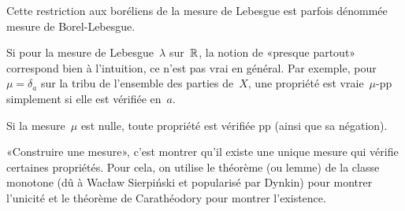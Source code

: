 Cette restriction aux boréliens de la mesure de Lebesgue est parfois dénommée mesure de Borel-Lebesgue.

\medskip
Si pour la mesure de Lebesgue~$\lambda$ sur~$\mathbb R$, la notion de «presque partout» correspond bien à l'intuition, ce n'est pas vrai en général.
Par exemple, pour~$\mu=\delta_a$ sur la tribu de l'ensemble des parties de~$X$, une propriété est vraie~$\mu$-pp simplement si elle est vérifiée en~$a$.

Si la mesure~$\mu$ est nulle, toute propriété est vérifiée pp (ainsi que sa négation).

\medskip
{}
«Construire une mesure», c'est montrer qu'il existe une unique mesure qui vérifie certaines propriétés. 
Pour cela, on utilise le théorème (ou lemme) de la classe monotone (dû à Wacław Sierpiński et popularisé par Dynkin) pour montrer l'unicité et le théorème de Carathéodory pour montrer l'existence.

